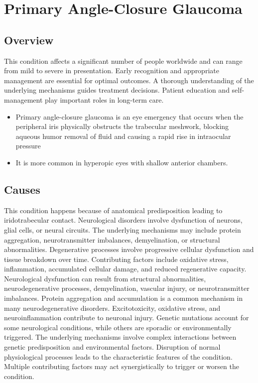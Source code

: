 \chapter{Primary Angle-Closure Glaucoma}
\label{sec:Primary Angle-Closure Glaucoma}

\section{Overview}
This condition affects a significant number of people worldwide and can range from mild to severe in presentation. Early recognition and appropriate management are essential for optimal outcomes. A thorough understanding of the underlying mechanisms guides treatment decisions. Patient education and self-management play important roles in long-term care.

\begin{itemize}[noitemsep]
  \item Primary angle-closure glaucoma is an eye emergency that occurs when the peripheral iris physically obstructs the trabecular meshwork, blocking aqueous humor removal of fluid and causing a rapid rise in intraocular pressure
  \item It is more common in hyperopic eyes with shallow anterior chambers.
\end{itemize}
\section{Causes}
This condition happens because of anatomical predisposition leading to iridotrabecular contact. Neurological disorders involve dysfunction of neurons, glial cells, or neural circuits. The underlying mechanisms may include protein aggregation, neurotransmitter imbalances, demyelination, or structural abnormalities. Degenerative processes involve progressive cellular dysfunction and tissue breakdown over time. Contributing factors include oxidative stress, inflammation, accumulated cellular damage, and reduced regenerative capacity. Neurological dysfunction can result from structural abnormalities, neurodegenerative processes, demyelination, vascular injury, or neurotransmitter imbalances. Protein aggregation and accumulation is a common mechanism in many neurodegenerative disorders. Excitotoxicity, oxidative stress, and neuroinflammation contribute to neuronal injury. Genetic mutations account for some neurological conditions, while others are sporadic or environmentally triggered. The underlying mechanisms involve complex interactions between genetic predisposition and environmental factors. Disruption of normal physiological processes leads to the characteristic features of the condition. Multiple contributing factors may act synergistically to trigger or worsen the condition.
